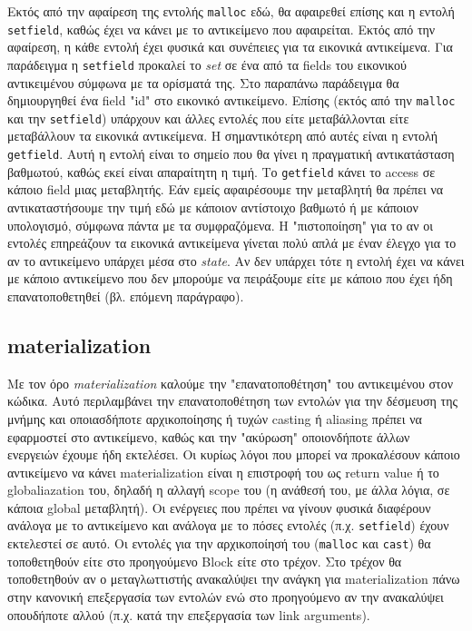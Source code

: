 Εκτός από την αφαίρεση της εντολής \texttt{malloc} εδώ, θα αφαιρεθεί επίσης και
η εντολή \texttt{setfield}, καθώς έχει να κάνει με το αντικείμενο που
αφαιρείται. Εκτός από την αφαίρεση, η κάθε εντολή έχει φυσικά και συνέπειες για
τα εικονικά αντικείμενα. Για παράδειγμα η \texttt{setfield} προκαλεί το
\textit{set} σε ένα από τα fields του εικονικού αντικειμένου σύμφωνα με τα
ορίσματά της. Στο παραπάνω παράδειγμα θα δημιουργηθεί ένα field "id" στο
εικονικό αντικείμενο. Επίσης (εκτός από την \texttt{malloc} και την
\texttt{setfield}) υπάρχουν και άλλες εντολές που είτε μεταβάλλονται είτε
μεταβάλλουν τα εικονικά αντικείμενα. Η σημαντικότερη από αυτές είναι η εντολή
\texttt{getfield}. Αυτή η εντολή είναι το σημείο που θα γίνει η πραγματική
αντικατάσταση βαθμωτού, καθώς εκεί είναι απαραίτητη η τιμή. Το \texttt{getfield}
κάνει το access σε κάποιο field μιας μεταβλητής. Εάν εμείς αφαιρέσουμε την
μεταβλητή θα πρέπει να αντικαταστήσουμε την τιμή εδώ με κάποιον αντίστοιχο
βαθμωτό ή με κάποιον υπολογισμό, σύμφωνα πάντα με τα συμφραζόμενα. Η
"πιστοποίηση" για το αν οι εντολές επηρεάζουν τα εικονικά αντικείμενα γίνεται
πολύ απλά με έναν έλεγχο για το αν το αντικείμενο υπάρχει μέσα στο
\textit{state}. Αν δεν υπάρχει τότε η εντολή έχει να κάνει με κάποιο αντικείμενο
που δεν μπορούμε να πειράξουμε είτε με κάποιο που έχει ήδη επανατοποθετηθεί (βλ.
επόμενη παράγραφο).

\subsection{materialization}

Με τον όρο \textit{materialization} καλούμε την "επανατοποθέτηση" του
αντικειμένου στον κώδικα. Αυτό περιλαμβάνει την επανατοποθέτηση των εντολών για
την δέσμευση της μνήμης και οποιασδήποτε αρχικοποίησης ή τυχών casting ή
aliasing πρέπει να εφαρμοστεί στο αντικείμενο, καθώς και την "ακύρωση"
οποιονδήποτε άλλων ενεργειών έχουμε ήδη εκτελέσει. Οι κυρίως λόγοι που μπορεί να
προκαλέσουν κάποιο αντικείμενο να κάνει materialization είναι η επιστροφή του ως
return value ή το globaliazation του, δηλαδή η αλλαγή scope του (η ανάθεσή του,
με άλλα λόγια, σε κάποια global μεταβλητή). Οι ενέργειες που πρέπει να γίνουν
φυσικά διαφέρουν ανάλογα με το αντικείμενο και ανάλογα με το πόσες εντολές (π.χ.
\texttt{setfield}) έχουν εκτελεστεί σε αυτό. Οι εντολές για την αρχικοποίησή του
(\texttt{malloc} και \texttt{cast}) θα τοποθετηθούν είτε στο προηγούμενο Block
είτε στο τρέχον. Στο τρέχον θα τοποθετηθούν αν ο μεταγλωττιστής ανακαλύψει την
ανάγκη για materialization πάνω στην κανονική επεξεργασία των εντολών ενώ στο
προηγούμενο αν την ανακαλύψει οπουδήποτε αλλού (π.χ. κατά την επεξεργασία των
link arguments).

